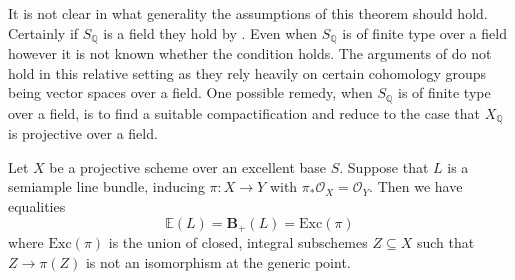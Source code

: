 \documentclass[a4paper,12pt]{book}
\newcommand{\BS}{\mathbf{B}_{+}}
\newcommand{\ox}[1][X]{\mathcal{O}_{#1}}
\begin{document}
\begin{remark}
	It is not clear in what generality the assumptions of this theorem should hold. Certainly if $S_{\mathbb{Q}}$ is a field they hold by \cite{birkar2017augmented}. Even when $S_{\mathbb{Q}}$ is of finite type over a field however it is not known whether the condition holds. The arguments of \cite{birkar2017augmented} do not hold in this relative setting as they rely heavily on certain cohomology groups being vector spaces over a field. One possible remedy, when $S_{\mathbb{Q}}$ is of finite type over a field, is to find a suitable compactification and reduce to the case that $X_{\mathbb{Q}}$ is projective over a field.
\end{remark}


\begin{lemma}\label{Case:SA}
	Let $X$ be a projective scheme over an excellent base $S$. Suppose that $L$ is a semiample line bundle, inducing $\pi:X \to Y$ with $\pi_{*}\ox=\mathcal{O}_{Y}$. Then we have equalities \[\mathbb{E}(L)=\BS(L)=\text{Exc}(\pi)\]
	where $\text{Exc}(\pi)$ is the union of closed, integral subschemes $Z \subseteq X$ such that $Z \to \pi(Z)$ is not an isomorphism at the generic point.
\end{lemma}
\end{document}
